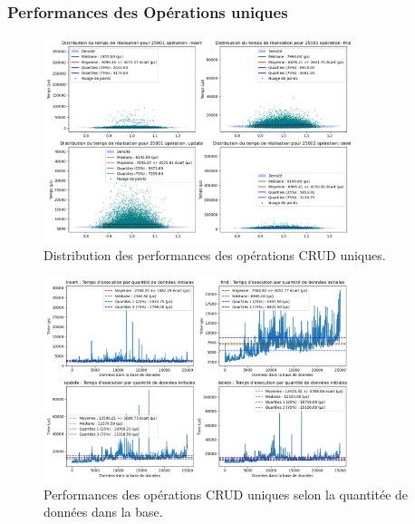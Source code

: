 \documentclass[12pt,a4paper]{report}
\begin{document}
            \subsubsection{Performances des Opérations uniques}

                \begin{figure}[H]
                    \centering
                    \includegraphics[width=0.8\textwidth]{../plots/MongoDB/sharding_indexed/global_test_one.png}
                    \caption{Distribution des performances des opérations CRUD uniques.}
                    \label{fig:mongo_sharded_global_one_indexed}
                \end{figure}

                \begin{figure}[H]
                    \centering
                    \includegraphics[width=0.8\textwidth]{../plots/MongoDB/sharding_indexed/test_one_various_data.png}
                    \caption{Performances des opérations CRUD uniques selon la quantitée de données dans la base.}
                    \label{fig:mongo_sharded_one_various_indexed}
                \end{figure}
            
\end{document}
